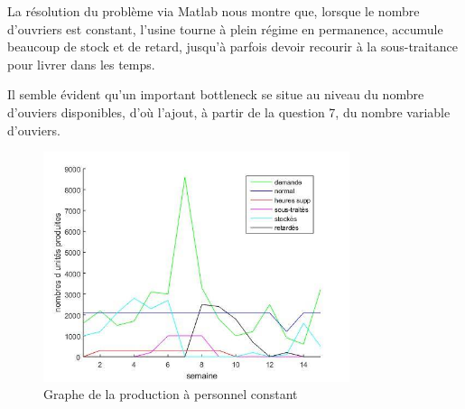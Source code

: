 La résolution du problème via Matlab nous montre que, lorsque le nombre d'ouvriers est constant, l'usine tourne à plein régime en permanence, accumule beaucoup de stock et de retard, jusqu'à parfois devoir recourir à la sous-traitance pour livrer dans les temps.

Il semble évident qu'un important bottleneck se situe au niveau du nombre d'ouviers disponibles, d'où l'ajout, à partir de la question 7, du nombre variable d'ouviers.

\begin{figure}[h]
    \centering
    \includegraphics[width=0.8\textwidth]{graphes/q3.jpg}
    \caption{Graphe de la production à personnel constant}
    \label{fig:q3}
\end{figure}
